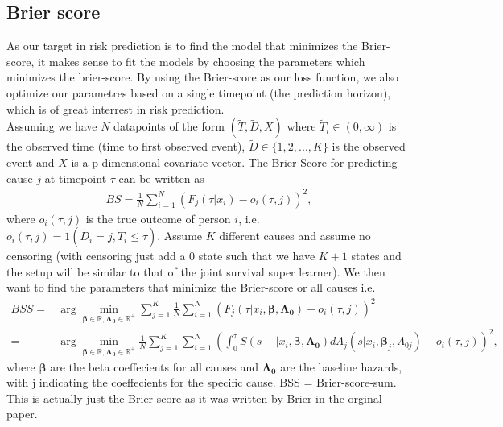 \documentclass{article}
\begin{document}
\subsection*{Brier score}
\label{sec:org8a984e9}
As our target in risk prediction is to find the model that minimizes the Brier-score, it makes sense to fit the models by choosing the parameters which minimizes the brier-score. By using the Brier-score as our loss function, we also optimize our parametres based on a single timepoint (the prediction horizon), which is of great interrest in risk prediction.
\\[0pt]
Assuming we have \(N\) datapoints of the form \((\tilde{T},\tilde{D},X)\) where \(\tilde{T}_i\in (0,\infty)\) is the observed time (time to first observed event), \(\tilde{D}\in\{1,2,...,K\}\) is the observed event and \(X\) is a p-dimensional covariate vector. The Brier-Score for predicting cause \(j\) at timepoint \(\tau\) can be written as
\begin{align*}
BS = \frac{1}{N}\sum_{i = 1}^N(F_j(\tau|x_i)-o_i(\tau,j))^2,
\end{align*}
where \(o_i(\tau,j)\) is the true outcome of person \(i\), i.e. \(o_i(\tau,j) = 1(\tilde{D}_i= j,\tilde{T}_i\leq \tau)\). Assume \(K\) different causes and assume no censoring (with censoring just add a 0 state such that we have \(K+1\) states and the setup will be similar to that of the joint survival super learner). We then want to find the parameters that minimize the Brier-score or all causes i.e.
\begin{align*}
BSS = &\arg\min_{\boldsymbol{\beta}\in\mathbb{R},\boldsymbol{\Lambda_0}\in\mathbb{R}^+}\sum_{j = 1}^K\frac{1}{N}\sum_{i = 1}^N(F_j(\tau|x_i,\boldsymbol{\beta},\boldsymbol{\Lambda_0})-o_i(\tau,j))^2\\
= &\arg\min_{\boldsymbol{\beta}\in\mathbb{R},\boldsymbol{\Lambda_0}\in\mathbb{R}^+}\frac{1}{N}\sum_{j = 1}^K\sum_{i = 1}^N\left(\int_0^{\tau} S(s-|x_i,\boldsymbol{\beta},\boldsymbol{\Lambda_0})d\Lambda_j(s|x_i,\boldsymbol{\beta}_j,\Lambda_{0j})-o_i(\tau,j)\right)^2,
\end{align*}
where \(\boldsymbol{\beta}\) are the beta coeffecients for all causes and \(\boldsymbol{\Lambda_0}\) are the baseline hazards, with j indicating the coeffecients for the specific cause. BSS = Brier-score-sum. This is actually just the Brier-score as it was written by Brier in the orginal paper. 
\end{document}
